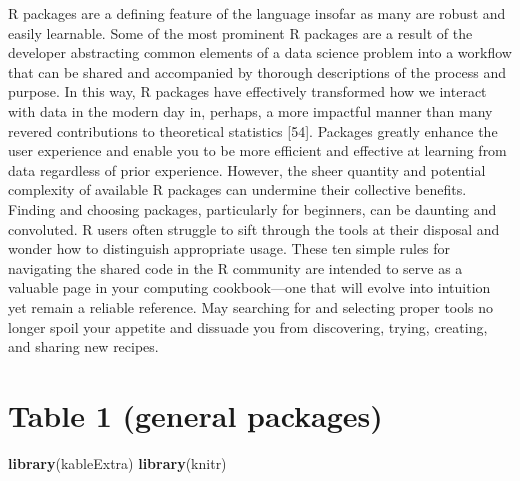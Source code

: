 \documentclass[10pt,letterpaper]{article}
\newenvironment{Shaded}{\begin{snugshade}}{\end{snugshade}}
\newcommand{\KeywordTok}[1]{\textcolor[rgb]{0.13,0.29,0.53}{\textbf{#1}}}
\newcommand{\NormalTok}[1]{#1}
\begin{document}
R packages are a defining feature of the language insofar as many are
robust and easily learnable. Some of the most prominent R packages are a
result of the developer abstracting common elements of a data science
problem into a workflow that can be shared and accompanied by thorough
descriptions of the process and purpose. In this way, R packages have
effectively transformed how we interact with data in the modern day in,
perhaps, a more impactful manner than many revered contributions to
theoretical statistics {[}54{]}. Packages greatly enhance the user
experience and enable you to be more efficient and effective at learning
from data regardless of prior experience. However, the sheer quantity
and potential complexity of available R packages can undermine their
collective benefits. Finding and choosing packages, particularly for
beginners, can be daunting and convoluted. R users often struggle to
sift through the tools at their disposal and wonder how to distinguish
appropriate usage. These ten simple rules for navigating the shared code
in the R community are intended to serve as a valuable page in your
computing cookbook---one that will evolve into intuition yet remain a
reliable reference. May searching for and selecting proper tools no
longer spoil your appetite and dissuade you from discovering, trying,
creating, and sharing new recipes.

\hypertarget{table-1-general-packages}{%
\section{Table 1 (general packages)}\label{table-1-general-packages}}

\begin{Shaded}
\begin{Highlighting}[]
\KeywordTok{library}\NormalTok{(kableExtra)}
\KeywordTok{library}\NormalTok{(knitr)}
\end{Highlighting}
\end{Shaded}
\end{document}
